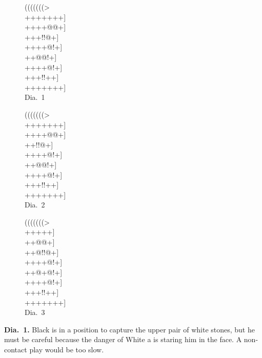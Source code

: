 \documentclass[mcrownvopaper,10pt,oneside,onecolumn,draft,showtrims]{memoir}
\begin{document}
\begin{figure}[ht]
    \begin{minipage}[c]{0.33\linewidth}
        \centering    
        {\gnos%
        (((((((>\\
        +++++++]\\
        ++++@@+]\\
        +++!!@+]\\
        ++++@!+]\\
        ++@@!+]\\
        ++++@!+]\\
        +++!!++]\\
        +++++++]\\
        }
        Dia.\ 1
    \end{minipage}%
    \begin{minipage}[c]{0.33\linewidth}
        \centering    
        {\gnos%
        (((((((>\\
        +++++++]\\
        ++++@@+]\\
        ++{\gnosb{}}!!@+]\\
        ++++@!+]\\
        ++@@!+]\\
        ++++@!+]\\
        +++!!++]\\
        +++++++]\\
        }
        Dia.\ 2
    \end{minipage}%
    \begin{minipage}[c]{0.33\linewidth}
        \centering    
        {\gnos%
        (((((((>\\
        ++{\gnosb{}}{\gnosw{}}+++]\\
        ++{\gnosb{}}{\gnosw{}}@@+]\\
        ++@!!@+]\\
        ++++@!+]\\
        ++@+@!+]\\
        ++++@!+]\\
        +++!!++]\\
        +++++++]\\
        }
        Dia.\ 3
    \end{minipage}%
\end{figure}


\textbf{Dia.\ 1.} Black is in a position to capture the upper pair of white stones,
but he must be careful because the danger of White a is staring him in
the face. A non-contact play would be too slow.
\end{document}
